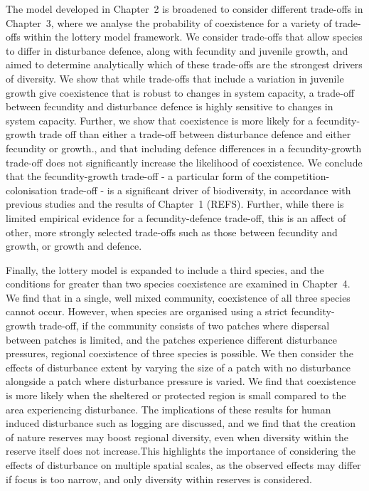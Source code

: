\documentclass[preprint,10pt,reqno]{amsart}
\begin{document}
The model developed in Chapter~2 is broadened to consider different trade-offs in Chapter~3, where we analyse the probability of coexistence for a variety of trade-offs within the lottery model framework. We consider trade-offs that allow species to differ in disturbance defence, along with fecundity and juvenile growth, and aimed to determine analytically which of these trade-offs are the strongest drivers of diversity. We show that while trade-offs that include a variation in juvenile growth give coexistence that is robust to changes in system capacity, a trade-off between fecundity and disturbance defence is highly sensitive to changes in system capacity. Further, we show that coexistence is more likely for a fecundity-growth trade off than either a trade-off between disturbance defence and either fecundity or growth., and that including defence differences in a fecundity-growth trade-off does not significantly increase the likelihood of coexistence. We conclude that the fecundity-growth trade-off - a particular form of the competition-colonisation trade-off - is a significant driver of biodiversity, in accordance with previous studies and the results of Chapter~1 (REFS). Further, while there is limited empirical evidence for a fecundity-defence trade-off, this is an affect of other, more strongly selected trade-offs such as those between fecundity and growth, or growth and defence.

Finally, the lottery model is expanded to include a third species, and the conditions for greater than two species coexistence are examined in Chapter~4. We find that in a single, well mixed community, coexistence of all three species cannot occur. However, when species are organised using a strict fecundity-growth trade-off, if the community consists of two patches where dispersal between patches is limited, and the patches experience different disturbance pressures, regional coexistence of three species is possible. We then consider the effects of disturbance extent by varying the size of a patch with no disturbance alongside a patch where disturbance pressure is varied. We find that coexistence is more likely when the sheltered or protected region is small compared to the area experiencing disturbance. The implications of these results for human induced disturbance such as logging are discussed, and we find that the creation of nature reserves may boost regional diversity, even when diversity within the reserve itself does not increase.This highlights the importance of considering the effects of disturbance on multiple spatial scales, as the observed effects may differ if focus is too narrow, and only diversity within reserves is considered.
\end{document}
